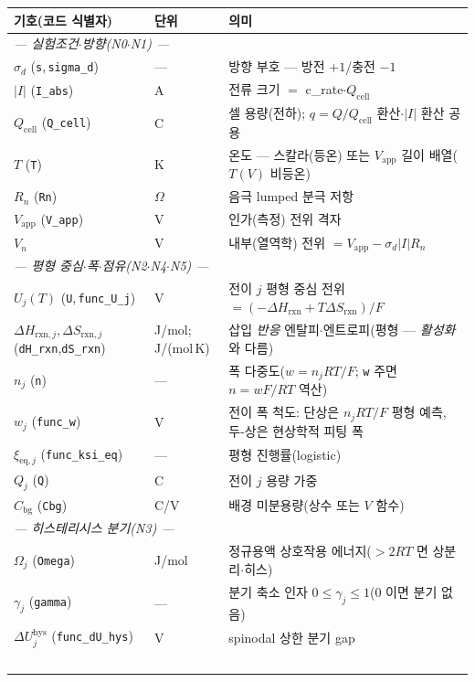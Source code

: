 \documentclass[11pt,a4paper]{article}
\newcommand{\eq}{\mathrm{eq}}
\newcommand{\app}{\mathrm{app}}
\newcommand{\cell}{\mathrm{cell}}
\newcommand{\bg}{\mathrm{bg}}
\newcommand{\rxn}{\mathrm{rxn}}
\newcommand{\hys}{\mathrm{hys}}
\newcommand{\code}[1]{\texttt{#1}}
\begin{document}
\begin{longtable}{p{} p{} p{}}
\toprule 기호(코드 식별자) & 단위 & 의미 \\ \midrule \endhead
\multicolumn{3}{l}{\emph{— 실험조건$\cdot$방향(N0$\cdot$N1) —}}\\
$\sigma_d$ (\code{s},\,\code{sigma\_d}) & --- & 방향 부호 — 방전 $+1$/충전 $-1$ \\
$|I|$ (\code{I\_abs}) & A & 전류 크기 $=$ c\_rate$\cdot Q_\cell$ \\
$Q_\cell$ (\code{Q\_cell}) & C & 셀 용량(전하); $q=Q/Q_\cell$ 환산$\cdot$$|I|$ 환산 공용 \\
$T$ (\code{T}) & K & 온도 — 스칼라(등온) 또는 $V_\app$ 길이 배열($T(V)$ 비등온) \\
$R_n$ (\code{Rn}) & $\Omega$ & 음극 lumped 분극 저항 \\
$V_\app$ (\code{V\_app}) & V & 인가(측정) 전위 격자 \\
$V_n$ & V & 내부(열역학) 전위 $=V_\app-\sigma_d|I|R_n$ \\
\multicolumn{3}{l}{\emph{— 평형 중심$\cdot$폭$\cdot$점유(N2$\cdot$N4$\cdot$N5) —}}\\
$U_j(T)$ (\code{U},\,\code{func\_U\_j}) & V & 전이 $j$ 평형 중심 전위 $=(-\Delta H_\rxn+T\Delta S_\rxn)/F$ \\
$\Delta H_{\rxn,j},\Delta S_{\rxn,j}$ (\code{dH\_rxn},\code{dS\_rxn}) & {\footnotesize J/mol;\,J/(mol\,K)} & 삽입 \emph{반응} 엔탈피$\cdot$엔트로피(평형 — \emph{활성화}와 다름) \\
$n_j$ (\code{n}) & --- & 폭 다중도($w=n_jRT/F$; \code{w} 주면 $n=wF/RT$ 역산) \\
$w_j$ (\code{func\_w}) & V & 전이 폭 척도: 단상은 $n_jRT/F$ 평형 예측, 두-상은 현상학적 피팅 폭 \\
$\xi_{\eq,j}$ (\code{func\_ksi\_eq}) & --- & 평형 진행률(logistic) \\
$Q_j$ (\code{Q}) & C & 전이 $j$ 용량 가중 \\
$C_\bg$ (\code{Cbg}) & C/V & 배경 미분용량(상수 또는 $V$ 함수) \\
\multicolumn{3}{l}{\emph{— 히스테리시스 분기(N3) —}}\\
$\Omega_j$ (\code{Omega}) & J/mol & 정규용액 상호작용 에너지($>2RT$ 면 상분리$\cdot$히스) \\
$\gamma_j$ (\code{gamma}) & --- & 분기 축소 인자 $0\le\gamma_j\le1$($0$ 이면 분기 없음) \\
$\Delta U_j^\hys$ (\code{func\_dU\_hys}) & V & spinodal 상한 분기 gap \\
$$
\end{longtable}
\end{document}
